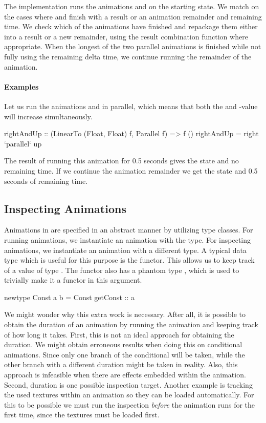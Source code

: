 The  implementation runs
the animations  and  on the starting
state. We match on the cases where  and
 finish with a result or an animation remainder and remaining
time. We check which of the animations have finished and repackage them
either into a result or a new remainder, using the result combination function
where appropriate. When the longest of the two parallel animations is finished
while not fully using the remaining delta time, we continue running the remainder
of the animation.

\paragraph{Examples}

Let us run the animations  and  in parallel, which means
that both the  and -value will increase simultaneously.

\begin{code}
rightAndUp :: (LinearTo (Float, Float) f, Parallel f) => f ()
rightAndUp = right `parallel` up
\end{code}

The result of running this animation for 0.5 seconds gives the state  and no remaining time. If we continue the animation
remainder we get the state  and 0.5 seconds of remaining 
time.

\subsection{Inspecting Animations}

Animations in \dsl{} are specified in an abstract manner by utilizing type classes. For running animations, we instantiate an animation with the  type. For inspecting animations, we instantiate an animation with a different type. A typical data type which is useful for this purpose is the  functor. This allows us to keep track of a value of type . The  functor also has a phantom type , which is used to trivially make it a functor in this argument.

\begin{spec}
newtype Const a b = Const { getConst :: a }
\end{spec}

We might wonder why this extra work is necessary. After all, it is possible to obtain the duration of an animation by running the animation and keeping track of how long it takes. First, this is not an ideal approach for obtaining the duration. We might obtain erroneous results when doing this on conditional animations. Since only one branch of the conditional will be taken, while the other branch with a different duration might be taken in reality. Also, this approach is infeasible when there are effects embedded within the animation. Second, duration is one possible inspection target. Another example is tracking the used textures within an animation so they can be loaded automatically. For this to be possible we must run the inspection \emph{before} the animation runs for the first time, since the textures must be loaded first.

